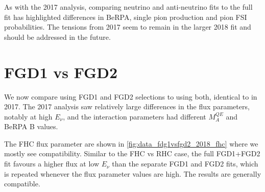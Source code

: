 As with the 2017 analysis, comparing neutrino and anti-neutrino fits to the full fit has highlighted differences in BeRPA, single pion production and pion FSI probabilities. The tensions from 2017 seem to remain in the larger 2018 fit and should be addressed in the future.

\section{FGD1 vs FGD2}
We now compare using FGD1 and FGD2 selections to using both, identical to in 2017. The 2017 analysis saw relatively large differences in the flux parameters, notably at high $E_\nu$, and the interaction parameters had different $M_A^{QE}$ and BeRPA B values.

The FHC flux parameter are shown in \autoref{fig:data_fdg1vsfgd2_2018_fhc} where we mostly see compatibility. Similar to the FHC vs RHC case, the full FGD1+FGD2 fit favours a higher flux at low $E_\nu$ than the separate FGD1 and FGD2 fits, which is repeated whenever the flux parameter values are high. The results are generally compatible.
